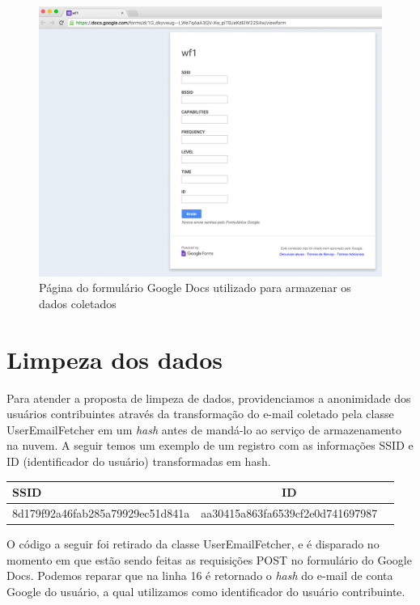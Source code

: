 \documentclass[12pt, %
openright, 
oneside,
a4paper,
brazil]{facom-ufu-abntex2}
\begin{document}
 
\begin{figure}[hbt]
  \includegraphics[scale=0.4]{form}
  \caption{Página do formulário Google Docs utilizado para armazenar os dados coletados}
\end{figure}


\section{Limpeza dos dados}
Para atender a proposta de limpeza de dados, providenciamos a anonimidade dos usuários contribuintes através da transformação do e-mail coletado pela classe UserEmailFetcher em um \emph{hash} antes de mandá-lo ao serviço de armazenamento na nuvem.
A seguir temos um exemplo de um registro com as informações \ac{SSID} e ID (identificador do usuário) transformadas em hash. 

\begin{center}
  \begin{tabular}{ l | c | r }
    \hline
    SSID & ID\\ \hline
    8d179f92a46fab285a79929ec51d841a & aa30415a863fa6539cf2e0d741697987 \\ \hline
  \end{tabular}
\end{center}


O código a seguir foi retirado da classe UserEmailFetcher, e é disparado no momento em que estão sendo feitas as requisições POST no formulário do Google Docs. Podemos reparar que na linha 16 é retornado o \emph{hash} do e-mail de conta Google do usuário, a qual utilizamos como identificador do usuário contribuinte. 
\end{document}
